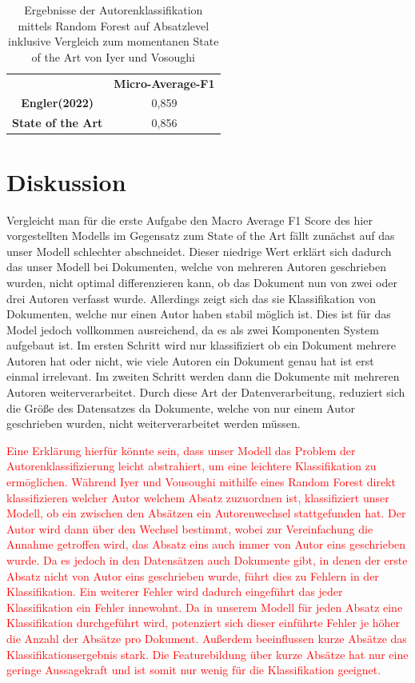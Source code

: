 \documentclass[conference]{IEEEtran}
\begin{document}
	\begin{table}[htbp]
		\caption{Ergebnisse der Autorenklassifikation mittels Random Forest auf Absatzlevel inklusive Vergleich zum momentanen State of the Art von Iyer und Vosoughi}
		\begin{center}
			\begin{tabular}{|cc|}
				\hline
				 & \textbf{Micro-Average-F1} \\
				 \cellcolor{gray!15}\textbf{Engler(2022)} & \cellcolor{gray!15}0,859 \\
				 \textbf{State of the Art} & 0,856 \\
				\hline
			\end{tabular}
			\label{tab:erg2}
		\end{center}
	\end{table}
\section{Diskussion}
	Vergleicht man für die erste Aufgabe den Macro Average F1 Score des hier vorgestellten Modells im Gegensatz zum State of the Art fällt zunächst auf das unser Modell schlechter abschneidet. Dieser niedrige Wert erklärt sich dadurch das unser Modell bei Dokumenten, welche von mehreren Autoren geschrieben wurden, nicht optimal differenzieren kann, ob das Dokument nun von zwei oder drei Autoren verfasst wurde. Allerdings zeigt sich das sie Klassifikation von Dokumenten, welche nur einen Autor haben stabil möglich ist. Dies ist für das Model jedoch vollkommen ausreichend, da es als zwei Komponenten System aufgebaut ist. Im ersten Schritt wird nur klassifiziert ob ein Dokument mehrere Autoren hat oder nicht, wie viele Autoren ein Dokument genau hat ist erst einmal irrelevant. Im zweiten Schritt werden dann die Dokumente mit mehreren Autoren weiterverarbeitet. Durch diese Art der Datenverarbeitung, reduziert sich die Größe des Datensatzes da Dokumente, welche von nur einem Autor geschrieben wurden, nicht weiterverarbeitet werden müssen.
	
	\textcolor{red}{Eine Erklärung hierfür könnte sein, dass unser Modell das Problem der Autorenklassifizierung leicht abstrahiert, um eine leichtere Klassifikation zu ermöglichen. Während Iyer und Vousoughi mithilfe eines Random Forest direkt klassifizieren welcher Autor welchem Absatz zuzuordnen ist, klassifiziert unser Modell, ob ein zwischen den Absätzen ein Autorenwechsel stattgefunden hat. Der Autor wird dann über den Wechsel bestimmt, wobei zur Vereinfachung die Annahme getroffen wird, das Absatz eins auch immer von Autor eins geschrieben wurde. Da es jedoch in den Datensätzen auch Dokumente gibt, in denen der erste Absatz nicht von Autor eins geschrieben wurde, führt dies zu Fehlern in der Klassifikation. Ein weiterer Fehler wird dadurch eingeführt das jeder Klassifikation ein Fehler innewohnt. Da in unserem Modell für jeden Absatz eine Klassifikation durchgeführt wird, potenziert sich dieser einführte Fehler je höher die Anzahl der Absätze pro Dokument. Außerdem beeinflussen kurze Absätze das Klassifikationsergebnis stark. Die Featurebildung über kurze Absätze hat nur eine geringe Aussagekraft und ist somit nur wenig für die Klassifikation geeignet. }
	
\end{document}
